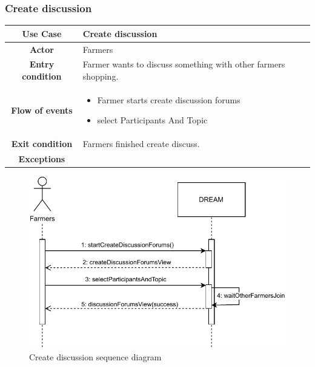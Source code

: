 \documentclass[../../main.tex]{subfiles}
\begin{document}
      \subsubsection{Create discussion}

      \begin{table}[H]
        \centering
          \begin{tabular}{c m{}}
          \hline
          \textbf{Use Case} & Create discussion\\ \hline
          \textbf{Actor} & Farmers\\ \hline
          \textbf{Entry condition} & Farmer wants to discuss something with other farmers shopping. \\  \hline
          \textbf{Flow of events} & \begin{itemize}
                                      \item Farmer starts create discussion forums
                                      \item  select Participants And Topic
                                    \end{itemize}\\ \hline
          \textbf{Exit condition} & Farmers finished create discuss. \\ \hline
          \textbf{Exceptions} & \\ \hline
          \end{tabular}
      \end{table}

      \begin{figure}[H]
        \centering
        \includegraphics[width=\textwidth]{RASD/image/Sequence_Diagram_Farmers-create discussion.pdf}
        \caption{Create discussion sequence diagram}
      \end{figure}
\end{document}
